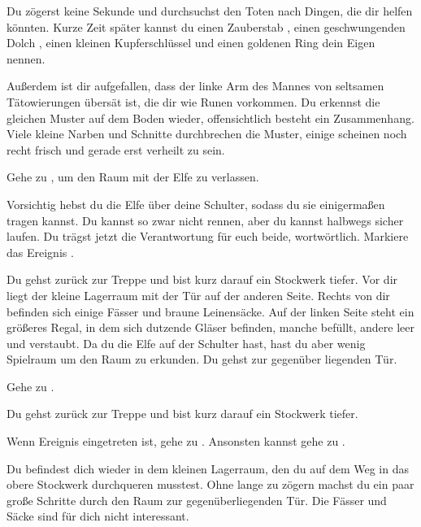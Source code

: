 Du zögerst keine Sekunde und durchsuchst den Toten nach Dingen, die dir helfen könnten.
Kurze Zeit später kannst du einen Zauberstab , einen geschwungenden Dolch , einen kleinen Kupferschlüssel  und einen goldenen Ring  dein Eigen nennen.

Außerdem ist dir aufgefallen, dass der linke Arm des Mannes von seltsamen Tätowierungen übersät ist, die dir wie Runen vorkommen. Du erkennst die gleichen Muster auf dem Boden wieder, offensichtlich besteht ein Zusammenhang. Viele kleine Narben und Schnitte durchbrechen die Muster, einige scheinen noch recht frisch und gerade erst verheilt zu sein.

Gehe zu , um den Raum mit der Elfe zu verlassen.


Vorsichtig hebst du die Elfe über deine Schulter, sodass du sie einigermaßen tragen kannst. Du kannst so zwar nicht rennen, aber du kannst halbwegs sicher laufen. Du trägst jetzt die Verantwortung für euch beide, wortwörtlich. Markiere das Ereignis .

Du gehst zurück zur Treppe und bist kurz darauf ein Stockwerk tiefer. Vor dir liegt der kleine Lagerraum mit der Tür auf der anderen Seite. Rechts von dir befinden sich einige Fässer und braune Leinensäcke. Auf der linken Seite steht ein größeres Regal, in dem sich dutzende Gläser befinden, manche befüllt, andere leer und verstaubt. Da du die Elfe auf der Schulter hast, hast du aber wenig Spielraum um den Raum zu erkunden. Du gehst zur gegenüber liegenden Tür.

Gehe zu .


Du gehst zurück zur Treppe und bist kurz darauf ein Stockwerk tiefer.

Wenn Ereignis  eingetreten ist, gehe zu .
Ansonsten kannst gehe zu .


Du befindest dich wieder in dem kleinen Lagerraum, den du auf dem Weg in das obere Stockwerk durchqueren musstest. Ohne lange zu zögern machst du ein paar große Schritte durch den Raum zur gegenüberliegenden Tür. Die Fässer und Säcke sind für dich nicht interessant.

